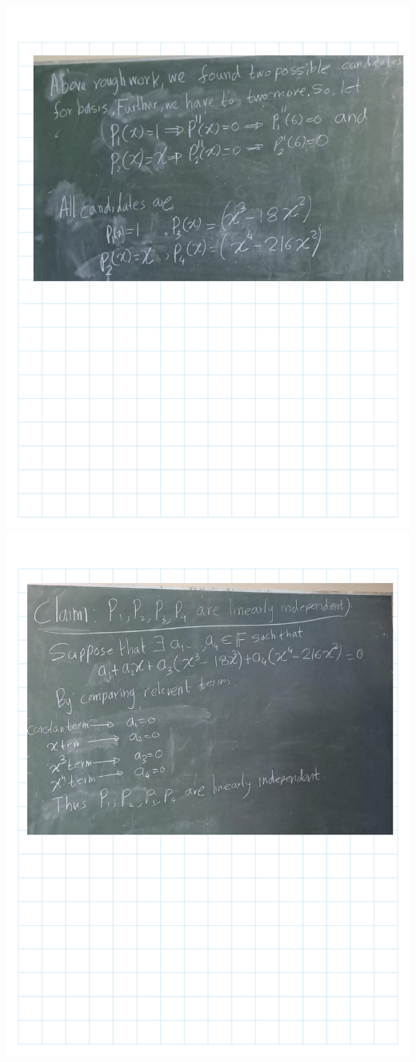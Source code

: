 \documentclass[
]{book}
\theoremstyle{definition}
\theoremstyle{definition}
\theoremstyle{definition}
\theoremstyle{definition}
\theoremstyle{remark}
\begin{document}
\includegraphics{fig/Ex 2B and 2C/Ex 2c (14).png}
\includegraphics{fig/Ex 2B and 2C/Ex 2c (15).png}
\end{document}
